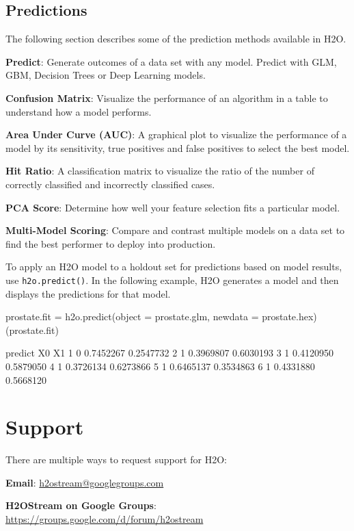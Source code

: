 \subsection{Predictions}

The following section describes some of the prediction methods available in H2O. 

{\textbf{Predict}}: Generate outcomes of a data set with any model. Predict with GLM, GBM, Decision Trees or Deep Learning models.\bigskip

{\textbf{Confusion Matrix}}: Visualize the performance of an algorithm in a table to understand how a model performs.\bigskip

{\textbf{Area Under Curve (AUC)}}: A graphical plot to visualize the performance of a model by its sensitivity, true positives and false positives to select the best model.\bigskip

{\textbf{Hit Ratio}}: A classification matrix to visualize the ratio of the number of correctly classified and incorrectly classified cases.\bigskip

{\textbf{PCA Score}}: Determine how well your feature selection fits a particular model.\bigskip

{\textbf{Multi-Model Scoring}}: Compare and contrast multiple models on a data set to find the best performer to deploy into production. 

To apply an H2O model to a holdout set for predictions based on model results, use {\texttt{h2o.predict()}}.  In the following example, H2O generates a model and then displays the predictions for that model. 
\begin{spverbatim}
prostate.fit = h2o.predict(object = prostate.glm, newdata = prostate.hex)
(prostate.fit)

        predict        X0        X1
      1       0 0.7452267 0.2547732
      2       1 0.3969807 0.6030193
      3       1 0.4120950 0.5879050
      4       1 0.3726134 0.6273866
      5       1 0.6465137 0.3534863
      6       1 0.4331880 0.5668120
\end{spverbatim}


\section{Support}
There are multiple ways to request support for H2O: \bigskip

{\textbf{Email}}: {\url{h2ostream@googlegroups.com}}

{\textbf{H2OStream on Google Groups}}: {\url{https://groups.google.com/d/forum/h2ostream}} 

